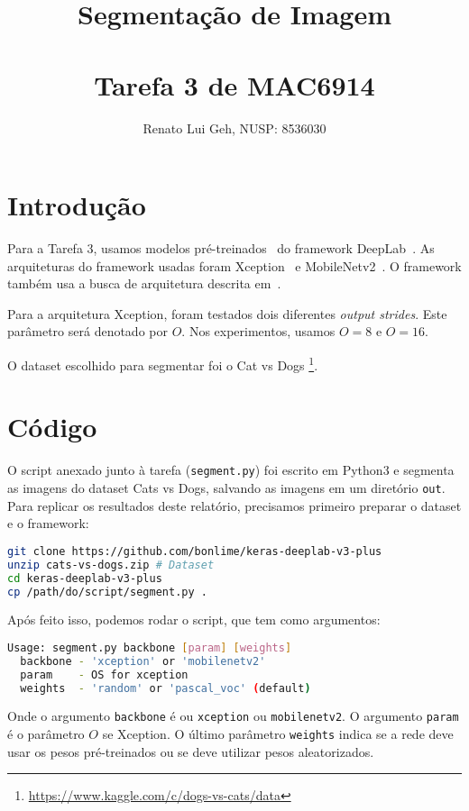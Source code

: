 \documentclass[12pt]{article}
\title{%
  Segmentação de Imagem\\~\\
  {\normalfont Tarefa 3 de MAC6914}
}
\author{Renato Lui Geh, NUSP: 8536030}
\date{}
\theoremstyle{plain}
\numberwithin{equation}{section}
\newcommand{\code}[1]{\lstinline[mathescape=true]{#1}}
\begin{document}
\maketitle

\section{Introdução}

Para a Tarefa 3, usamos modelos pré-treinados~\cite{trained-deeplab} do framework
DeepLab~\cite{deeplab}. As arquiteturas do framework usadas foram Xception~\cite{deeplabv3plus2018}
e MobileNetv2~\cite{mobilenetv22018}. O framework também usa a busca de arquitetura descrita
em~\cite{dpc2018}.

Para a arquitetura Xception, foram testados dois diferentes \textit{output strides}. Este parâmetro
será denotado por $O$. Nos experimentos, usamos $O=8$ e $O=16$.

O dataset escolhido para segmentar foi o Cat vs Dogs
\footnote{\url{https://www.kaggle.com/c/dogs-vs-cats/data}}.

\section{Código}

O script anexado junto à tarefa (\code{segment.py}) foi escrito em Python3 e segmenta as imagens
do dataset Cats vs Dogs, salvando as imagens em um diretório \code{out}. Para replicar os
resultados deste relatório, precisamos primeiro preparar o dataset e o framework:

\begin{lstlisting}[language=Bash,numbers=none]
git clone https://github.com/bonlime/keras-deeplab-v3-plus
unzip cats-vs-dogs.zip # Dataset
cd keras-deeplab-v3-plus
cp /path/do/script/segment.py .
\end{lstlisting}

Após feito isso, podemos rodar o script, que tem como argumentos:

\begin{lstlisting}[language=Bash, numbers=none]
Usage: segment.py backbone [param] [weights]
  backbone - 'xception' or 'mobilenetv2'
  param    - OS for xception
  weights  - 'random' or 'pascal_voc' (default)
\end{lstlisting}

Onde o argumento \code{backbone} é ou \code{xception} ou \code{mobilenetv2}. O argumento
\code{param} é o parâmetro $O$ se Xception. O último parâmetro \code{weights} indica se a rede deve
usar os pesos pré-treinados ou se deve utilizar pesos aleatorizados.
\end{document}

